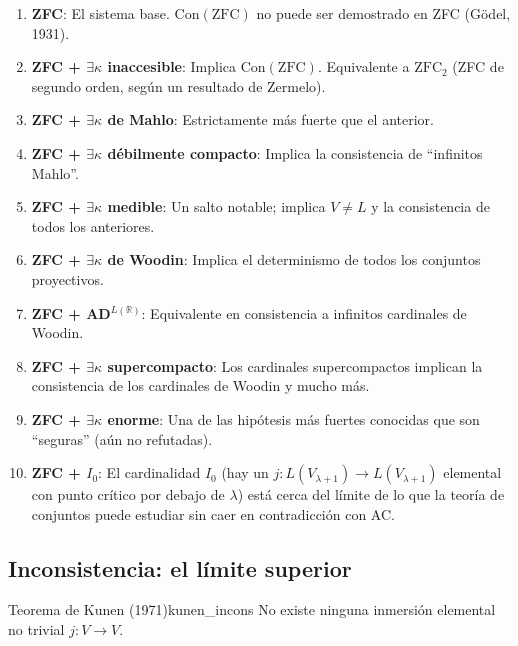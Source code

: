 \begin{enumerate}[leftmargin=2em, label=\textbf{N\arabic*.}]
  \item \textbf{ZFC}: El sistema base. $\mathrm{Con}(\mathrm{ZFC})$ no puede ser demostrado en ZFC (Gödel, 1931).

  \item \textbf{ZFC + $\exists\kappa$ inaccesible}: Implica $\mathrm{Con}(\mathrm{ZFC})$. Equivalente a $\mathrm{ZFC}_2$ (ZFC de segundo orden, según un resultado de Zermelo).

  \item \textbf{ZFC + $\exists\kappa$ de Mahlo}: Estrictamente más fuerte que el anterior.

  \item \textbf{ZFC + $\exists\kappa$ débilmente compacto}: Implica la consistencia de ``infinitos Mahlo''.

  \item \textbf{ZFC + $\exists\kappa$ medible}: Un salto notable; implica $V \neq L$ y la consistencia de todos los anteriores.

  \item \textbf{ZFC + $\exists\kappa$ de Woodin}: Implica el determinismo de todos los conjuntos proyectivos.

  \item \textbf{ZFC + AD$^{L(\mathbb{R})}$}: Equivalente en consistencia a infinitos cardinales de Woodin.

  \item \textbf{ZFC + $\exists\kappa$ supercompacto}: Los cardinales supercompactos implican la consistencia de los cardinales de Woodin y mucho más.

  \item \textbf{ZFC + $\exists\kappa$ enorme}: Una de las hipótesis más fuertes conocidas que son ``seguras'' (aún no refutadas).

  \item \textbf{ZFC + $I_0$}: El cardinalidad $I_0$ (hay un $j: L(V_{\lambda+1}) \to L(V_{\lambda+1})$ elemental con punto crítico por debajo de $\lambda$) está cerca del límite de lo que la teoría de conjuntos puede estudiar sin caer en contradicción con AC.
\end{enumerate}

\subsection{Inconsistencia: el límite superior}

\begin{teorema}{Teorema de Kunen (1971)}{kunen_incons}
No existe ninguna inmersión elemental no trivial $j: V \to V$.
\end{teorema}

